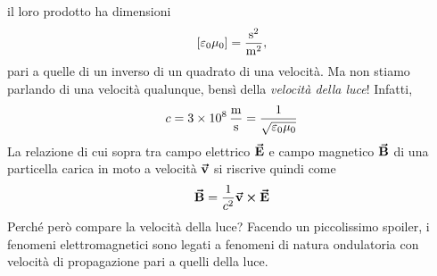il loro prodotto ha dimensioni
\begin{equation*}
	\left[\epsilon_0\mu_0\right]=\unit[per-mode = fraction]{\second\squared\per\meter\squared},
\end{equation*}
pari a quelle di un inverso di un quadrato di una velocità. Ma non stiamo parlando di una velocità qualunque, bensì della \textit{velocità della luce}! Infatti,
\begin{equation*}
	c=\SI[per-mode = fraction]{3d8}{\meter\per\second}=\frac{1}{\sqrt{\epsilon_0\mu_0}}
\end{equation*}
La relazione di cui sopra tra campo elettrico $\vba{E}$ e campo magnetico $\vba{B}$ di una particella carica in moto a velocità $\vba{v}$ si riscrive quindi come
\begin{equation}
	\vba{B}=\frac{1}{c^2}\vba{v}\cross\vba{E}
\end{equation}
Perché però compare la velocità della luce? Facendo un piccolissimo spoiler, i fenomeni elettromagnetici sono legati a fenomeni di natura ondulatoria con velocità di propagazione pari a quelli della luce.
